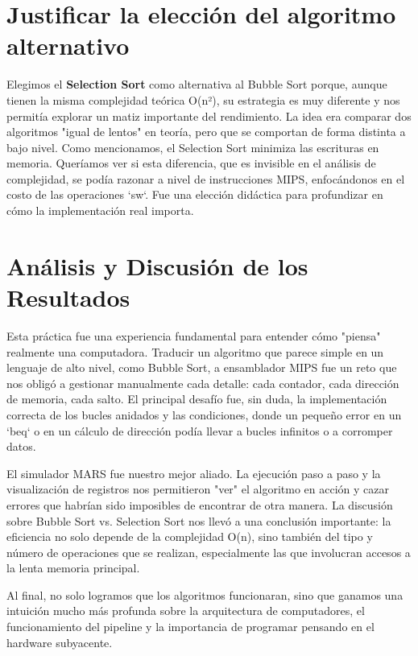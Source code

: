 \documentclass{article}
\begin{document}
\section{Justificar la elección del algoritmo alternativo}
\indent\indent Elegimos el \textbf{Selection Sort} como alternativa al Bubble Sort porque, aunque tienen la misma complejidad teórica O(n²), su estrategia es muy diferente y nos permitía explorar un matiz importante del rendimiento. La idea era comparar dos algoritmos "igual de lentos" en teoría, pero que se comportan de forma distinta a bajo nivel. Como mencionamos, el Selection Sort minimiza las escrituras en memoria. Queríamos ver si esta diferencia, que es invisible en el análisis de complejidad, se podía razonar a nivel de instrucciones MIPS, enfocándonos en el costo de las operaciones `sw`. Fue una elección didáctica para profundizar en cómo la implementación real importa.

\section{Análisis y Discusión de los Resultados}
\indent\indent Esta práctica fue una experiencia fundamental para entender cómo "piensa" realmente una computadora. Traducir un algoritmo que parece simple en un lenguaje de alto nivel, como Bubble Sort, a ensamblador MIPS fue un reto que nos obligó a gestionar manualmente cada detalle: cada contador, cada dirección de memoria, cada salto. El principal desafío fue, sin duda, la implementación correcta de los bucles anidados y las condiciones, donde un pequeño error en un `beq` o en un cálculo de dirección podía llevar a bucles infinitos o a corromper datos.\newline

\noindent El simulador MARS fue nuestro mejor aliado. La ejecución paso a paso y la visualización de registros nos permitieron "ver" el algoritmo en acción y cazar errores que habrían sido imposibles de encontrar de otra manera. La discusión sobre Bubble Sort vs. Selection Sort nos llevó a una conclusión importante: la eficiencia no solo depende de la complejidad O(n), sino también del tipo y número de operaciones que se realizan, especialmente las que involucran accesos a la lenta memoria principal.\newline

\noindent Al final, no solo logramos que los algoritmos funcionaran, sino que ganamos una intuición mucho más profunda sobre la arquitectura de computadores, el funcionamiento del pipeline y la importancia de programar pensando en el hardware subyacente.

\endgroup
\end{document}
